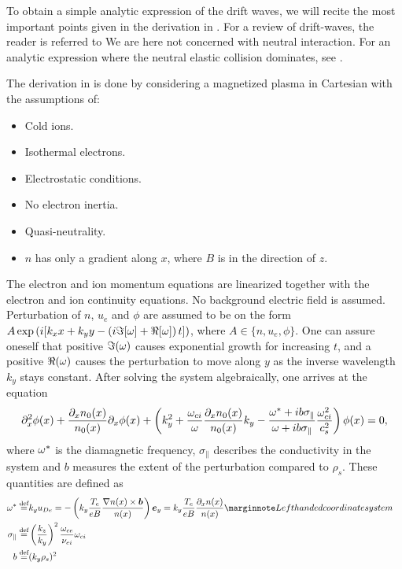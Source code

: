 To obtain a simple analytic expression of the drift waves, we will recite the most important points given in the derivation in \cite{Pecseli2016book}.
For a review of drift-waves, the reader is referred to \cite{Horton1999}
We are here not concerned with neutral interaction.
For an analytic expression where the neutral elastic collision dominates, see \cite{Ellis1980}.

The derivation in \cite{Pecseli2016book} is done by considering a magnetized plasma in Cartesian with the assumptions of:
%
\begin{itemize}[noitemsep]
    \item Cold ions.
    \item Isothermal electrons.
    \item Electrostatic conditions.
    \item No electron inertia.
    \item Quasi-neutrality.
    \item $n$ has only a gradient along $x$, where $B$ is in the direction of $z$.
\end{itemize}
%
The electron and ion momentum equations are linearized together with the electron and ion continuity equations.
No background electric field is assumed.
Perturbation of $n$, $u_e$ and $\phi$ are assumed to be on the form $A\exp\left(i[k_x x + k_y y - \left(i\Im[\omega] + \Re[\omega]\right) t]\right)$, where $A \in \{n, u_e, \phi\}$.
One can assure oneself that positive $\Im(\omega)$ causes exponential growth for increasing $t$, and a positive $\Re(\omega)$ causes the perturbation to move along $y$ as the inverse wavelength $k_y$ stays constant.
After solving the system algebraically, one arrives at the equation
%
\begin{align}
    \partial_x^2 \phi(x) +
    \frac{\partial_x n_0(x)}{n_0(x)}\partial_x \phi(x)+
    \left(k_y^2 +
    \frac{\omega_{ci}}{\omega}\frac{\partial_x n_0(x)}{n_0(x)}k_y -
    \frac{\omega^*+ib\sigma_\|}{\omega+ib\sigma_\|}\frac{\omega_{ci}^2}{c_s^2}
    \right)\phi(x)
    =0,
    \label{eq:fullDisp}
\end{align}
%
where $\omega^*$ is the diamagnetic frequency, $\sigma_\|$ describes the conductivity in the system and $b$ measures the extent of the perturbation compared to $\rho_s$.
These quantities are defined as
%
\begin{align*}
    \om^* \defined& k_y u_{De} =
    -\L(k_y \frac{T_e}{eB}\frac{\grad n(x)\times \ve{b}}{n(x)}\R)\ve{e}_y
    =
    k_y \frac{T_e}{eB}\frac{\partial_x n(x)}{n(x)}
    \note{Left handed coordinate system}
    \\
    \sigma_\| \defined& \L(\frac{k_z}{k_y}\R)^2 \frac{\om_{ce}}{\nu_{ei}}\om_{ci}\\
    b \defined& (k_y \rho_s)^2&
\end{align*}
